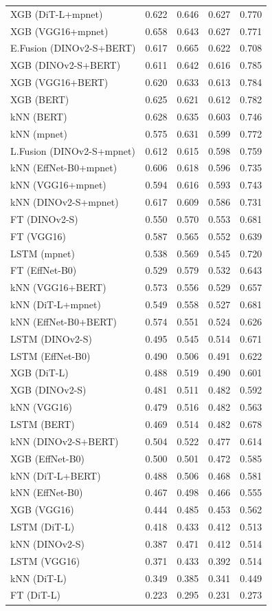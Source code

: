 \begin{longtable}{lrrrr}
XGB (DiT-L+mpnet) & 0.622 & 0.646 & 0.627 & 0.770 \\
XGB (VGG16+mpnet) & 0.658 & 0.643 & 0.627 & 0.771 \\
E.Fusion (DINOv2-S+BERT) & 0.617 & 0.665 & 0.622 & 0.708 \\
XGB (DINOv2-S+BERT) & 0.611 & 0.642 & 0.616 & 0.785 \\
XGB (VGG16+BERT) & 0.620 & 0.633 & 0.613 & 0.784 \\
XGB (BERT) & 0.625 & 0.621 & 0.612 & 0.782 \\
kNN (BERT) & 0.628 & 0.635 & 0.603 & 0.746 \\
kNN (mpnet) & 0.575 & 0.631 & 0.599 & 0.772 \\
L.Fusion (DINOv2-S+mpnet) & 0.612 & 0.615 & 0.598 & 0.759 \\
kNN (EffNet-B0+mpnet) & 0.606 & 0.618 & 0.596 & 0.735 \\
kNN (VGG16+mpnet) & 0.594 & 0.616 & 0.593 & 0.743 \\
kNN (DINOv2-S+mpnet) & 0.617 & 0.609 & 0.586 & 0.731 \\
FT (DINOv2-S) & 0.550 & 0.570 & 0.553 & 0.681 \\
FT (VGG16) & 0.587 & 0.565 & 0.552 & 0.639 \\
LSTM (mpnet) & 0.538 & 0.569 & 0.545 & 0.720 \\
FT (EffNet-B0) & 0.529 & 0.579 & 0.532 & 0.643 \\
kNN (VGG16+BERT) & 0.573 & 0.556 & 0.529 & 0.657 \\
kNN (DiT-L+mpnet) & 0.549 & 0.558 & 0.527 & 0.681 \\
kNN (EffNet-B0+BERT) & 0.574 & 0.551 & 0.524 & 0.626 \\
LSTM (DINOv2-S) & 0.495 & 0.545 & 0.514 & 0.671 \\
LSTM (EffNet-B0) & 0.490 & 0.506 & 0.491 & 0.622 \\
XGB (DiT-L) & 0.488 & 0.519 & 0.490 & 0.601 \\
XGB (DINOv2-S) & 0.481 & 0.511 & 0.482 & 0.592 \\
kNN (VGG16) & 0.479 & 0.516 & 0.482 & 0.563 \\
LSTM (BERT) & 0.469 & 0.514 & 0.482 & 0.678 \\
kNN (DINOv2-S+BERT) & 0.504 & 0.522 & 0.477 & 0.614 \\
XGB (EffNet-B0) & 0.500 & 0.501 & 0.472 & 0.585 \\
kNN (DiT-L+BERT) & 0.488 & 0.506 & 0.468 & 0.581 \\
kNN (EffNet-B0) & 0.467 & 0.498 & 0.466 & 0.555 \\
XGB (VGG16) & 0.444 & 0.485 & 0.453 & 0.562 \\
LSTM (DiT-L) & 0.418 & 0.433 & 0.412 & 0.513 \\
kNN (DINOv2-S) & 0.387 & 0.471 & 0.412 & 0.514 \\
LSTM (VGG16) & 0.371 & 0.433 & 0.392 & 0.514 \\
kNN (DiT-L) & 0.349 & 0.385 & 0.341 & 0.449 \\
FT (DiT-L) & 0.223 & 0.295 & 0.231 & 0.273 \\
\end{longtable}

